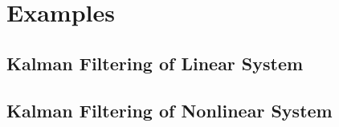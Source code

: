 
\appendix               	%
\chapter{Examples} 
\section{Kalman Filtering of Linear System} \label{ExampleKF} 


\section{Kalman Filtering of Nonlinear System} \label{ExampleEKF}
